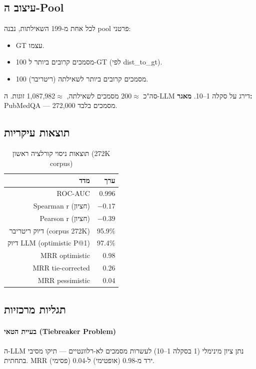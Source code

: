 \documentclass[12pt, a4paper]{article}
\begin{document}
\subsection{עיצוב ה-Pool}
לכל אחת מ-199 השאילתות, נבנה \textenglish{pool} פרטני:
\begin{itemize}
  \item \textenglish{GT} עצמו.
  \item 100 מסמכים קרובים ביותר ל-\textenglish{GT} (לפי \textenglish{dist\_to\_gt}).
  \item 100 מסמכים קרובים ביותר לשאילתה (ריטריבר).
\end{itemize}
סה"כ $\approx$200 מסמכים לשאילתה, $\approx$1{,}087{,}982 זוגות. ה-\textenglish{LLM} דירג על סקלה 1--10.
\textbf{מאגר:} \textenglish{PubMedQA} --- 272{,}000 מסמכים בלבד.

\subsection{תוצאות עיקריות}

\begin{table}[H]
\centering
\caption{תוצאות ניסוי קורלציה ראשון (272K corpus)}
\begin{tabular}{rr}
\toprule
\textbf{מדד} & \textbf{ערך} \\
\midrule
\textenglish{ROC-AUC} & 0.996 \\
\textenglish{Spearman r} (חציון) & $-0.17$ \\
\textenglish{Pearson r} (חציון) & $-0.39$ \\
דיוק ריטריבר (\textenglish{corpus} 272K) & 95.9\% \\
דיוק \textenglish{LLM} (\textenglish{optimistic P@1}) & 97.4\% \\
\textenglish{MRR optimistic} & 0.98 \\
\textenglish{MRR tie-corrected} & 0.26 \\
\textenglish{MRR pessimistic} & 0.04 \\
\bottomrule
\end{tabular}
\end{table}

\subsection{תגליות מרכזיות}

\paragraph{בעיית הטאי (Tiebreaker Problem)}
ה-\textenglish{LLM} נתן ציון מינימלי (1 בסקלה 1--10) לעשרות מסמכים לא-רלוונטיים --- תיקו מסיבי בתחתית. \textenglish{MRR} ירד מ-$0.98$ (אופטימי) ל-$0.04$ (פסימי).
\end{document}
